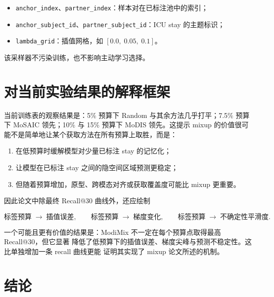 \documentclass[11pt,a4paper]{article}
\theoremstyle{definition}
\begin{document}
\begin{itemize}[itemsep=1pt]
  \item \texttt{anchor\_index}、\texttt{partner\_index}：样本对在已标注池中的索引；
  \item \texttt{anchor\_subject\_id}、\texttt{partner\_subject\_id}：ICU stay 的主题标识；
  \item \texttt{lambda\_grid}：插值网格，如 $[0.0,\;0.05,\;0.1]$。
\end{itemize}

该采样器不污染训练，也不影响主动学习选择。

\section{对当前实验结果的解释框架}
\label{sec:interpretation}

当前训练表的观察结果是：5\% 预算下 Random 与其余方法几乎打平；7.5\% 预算下 MoSAIC
领先；10\% 与 15\% 预算下 MoDIS 领先。这提示
mixup 的价值很可能不是简单地让某个获取方法在所有预算上取胜，而是：

\begin{enumerate}[itemsep=1pt]
  \item 在低预算时缓解模型对少量已标注 stay 的记忆化；
  \item 让模型在已标注 stay 之间的隐空间区域预测更稳定；
  \item 但随着预算增加，原型、跨模态对齐或获取覆盖度可能比 mixup 更重要。
\end{enumerate}

因此论文中除最终 Recall@30 曲线外，还应绘制

\begin{equation}
  \text{标签预算}\;\to\;\text{插值误差},\qquad
  \text{标签预算}\;\to\;\text{梯度变化},\qquad
  \text{标签预算}\;\to\;\text{不确定性平滑度}.
  \label{eq:budget-curves}
\end{equation}

一个可能且更有价值的结果是：ModiMix 不一定在每个预算点取得最高 Recall@30，但它显著
降低了低预算下的插值误差、梯度尖峰与预测不稳定性。这比单独增加一条 recall 曲线更能
证明其实现了 mixup 论文所述的机制。

\section{结论}
\label{sec:conclusion}
\end{document}
